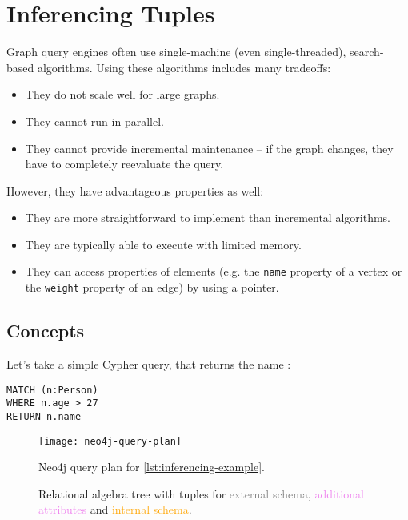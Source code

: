 \chapter{Inferencing Tuples}

Graph query engines often use single-machine (even single-threaded), search-based algorithms. Using these algorithms includes many tradeoffs:

\begin{itemize}
	\item They do not scale well for large graphs.
	\item They cannot run in parallel.
	\item They cannot provide incremental maintenance -- if the graph changes, they have to completely reevaluate the query.
\end{itemize}

However, they have advantageous properties as well:

\begin{itemize}
	\item They are more straightforward to implement than incremental algorithms.
	\item They are typically able to execute with limited memory.
	\item They can access properties of elements (e.g. the \texttt{name} property of a vertex or the \texttt{weight} property of an edge) by using a pointer.
\end{itemize}

\section{Concepts}

Let's take a simple Cypher query, that returns the name :

\begin{lstlisting}[label=lst:inferencing-example, caption=Example query]
MATCH (n:Person)
WHERE n.age > 27
RETURN n.name
\end{lstlisting}

\newcommand{\screenshotscale}{0.45}

\begin{figure}
	\centering
	\texttt{[image: neo4j-query-plan]}
	\caption{Neo4j query plan for \autoref{lst:inferencing-example}.}
	\label{fig:neo4-query-plan}
\end{figure}

\begin{figure}
	\centering
	
	\caption{Relational algebra tree with tuples for \textcolor{gray}{external schema}, \textcolor{violet}{additional attributes} and \textcolor{orange}{internal schema}.}
	\label{fig:example-inferencing}
\end{figure}

